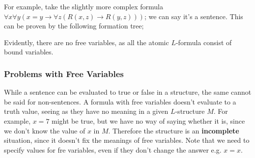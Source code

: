 \documentclass[a4paper, 12pt]{article}
\begin{document}
        For example, take the slightly more complex formula $\forall x \forall y (x = y \rightarrow \forall z (R(x, z) \rightarrow R(y, z)))$; we can say it's a sentence. This can be proven by the following formation tree;
        \begin{center}
        \end{center}
        Evidently, there are no free variables, as all the atomic $L$-formula consist of bound variables.
        \subsubsection*{Problems with Free Variables}
        While a sentence can be evaluated to true or false in a structure, the same cannot be said for non-sentences. A formula with free variables doesn't evaluate to a truth value, seeing as they have no meaning in a given $L$-structure $M$. For example, $x = 7$ might be true, but we have no way of saying whether it is, since we don't know the value of $x$ in $M$. Therefore the structure is an \textbf{incomplete} situation, since it doesn't fix the meanings of free variables. Note that we need to specify values for fre variables, even if they don't change the answer e.g. $x = x$.
        \medskip
\end{document}
